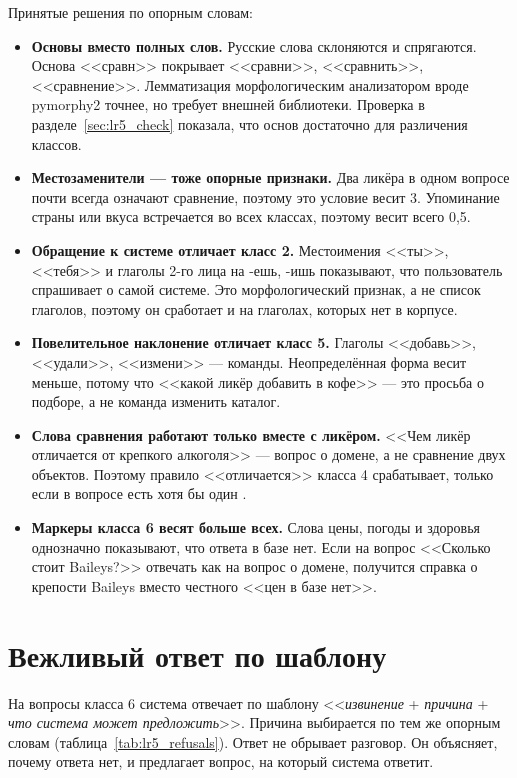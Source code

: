 Принятые решения по опорным словам:
\begin{itemize}[leftmargin=1.6\parindent, label*=---]
	\item \textbf{Основы вместо полных слов.} Русские слова склоняются и спрягаются. Основа <<сравн>> покрывает <<сравни>>, <<сравнить>>, <<сравнение>>. Лемматизация морфологическим анализатором вроде pymorphy2 точнее, но требует внешней библиотеки. Проверка в разделе~\ref{sec:lr5_check} показала, что основ достаточно для различения классов.
	\item \textbf{Местозаменители --- тоже опорные признаки.} Два ликёра в одном вопросе почти всегда означают сравнение, поэтому это условие весит 3. Упоминание страны или вкуса встречается во всех классах, поэтому весит всего 0,5.
	\item \textbf{Обращение к системе отличает класс 2.} Местоимения <<ты>>, <<тебя>> и глаголы 2-го лица на -ешь, -ишь показывают, что пользователь спрашивает о самой системе. Это морфологический признак, а не список глаголов, поэтому он сработает и на глаголах, которых нет в корпусе.
	\item \textbf{Повелительное наклонение отличает класс 5.} Глаголы <<добавь>>, <<удали>>, <<измени>> --- команды. Неопределённая форма весит меньше, потому что <<какой ликёр добавить в кофе>> --- это просьба о подборе, а не команда изменить каталог.
	\item \textbf{Слова сравнения работают только вместе с ликёром.} <<Чем ликёр отличается от крепкого алкоголя>> --- вопрос о домене, а не сравнение двух объектов. Поэтому правило <<отличается>> класса 4 срабатывает, только если в вопросе есть хотя бы один .
	\item \textbf{Маркеры класса 6 весят больше всех.} Слова цены, погоды и здоровья однозначно показывают, что ответа в базе нет. Если на вопрос <<Сколько стоит Baileys?>> отвечать как на вопрос о домене, получится справка о крепости Baileys вместо честного <<цен в базе нет>>.
\end{itemize}

\section{Вежливый ответ по шаблону}

На вопросы класса 6 система отвечает по шаблону <<\textit{извинение} + \textit{причина} + \textit{что система может предложить}>>. Причина выбирается по тем же опорным словам (таблица~\ref{tab:lr5_refusals}). Ответ не обрывает разговор. Он объясняет, почему ответа нет, и предлагает вопрос, на который система ответит.

